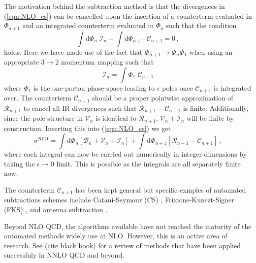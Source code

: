 \documentclass[main.tex]{subfiles}
\begin{document}
    The motivation behind the subtraction method is that the
    divergences in (\ref{eqn:NLO_cs}) can be cancelled upon the insertion
    of a counterterm evaluated in $\Phi_{n+1}$ and an integrated counterterm
    evaluated in $\Phi_{n}$ such that the condition
    \begin{equation}\label{eqn:subtraction_term_condition}
        \int \mathrm{d}\Phi_{n} \; \mathcal{I}_{n} - \int \mathrm{d}\Phi_{n+1} \; \mathcal{C}_{n+1} = 0 \, ,
    \end{equation}
    holds. Here we have made use of the fact that
    $\Phi_{n+1} \rightarrow \Phi_{n}\Phi_{1}$ when using
    an appropriate $3 \rightarrow 2$ momentum mapping such that
    \begin{equation}\label{eqn:integrated_counterterm}
        \mathcal{I}_{n} = \int \Phi_{1} \; \mathcal{C}_{n+1}
    \end{equation}
    where $\Phi_{1}$ is the one-parton phase-space leading
    to $\epsilon$ poles once $\mathcal{C}_{n+1}$ is integrated over.
    The counterterm $\mathcal{C}_{n+1}$ should be a proper
    pointwise approximation of $\mathcal{R}_{n+1}$ to cancel all IR
    divergences such that $\mathcal{R}_{n+1} - \mathcal{C}_{n+1}$ is finite.
    Additionally, since the pole structure in $\mathcal{V}_{n}$ is identical
    to $\mathcal{R}_{n+1}$, $\mathcal{V}_{n} + \mathcal{I}_{n}$ will be finite
    by construction.
    Inserting this into (\ref{eqn:NLO_cs}) we get
    \begin{equation}\label{eqn:NLO_subtraction}
        \sigma^{\mathrm{NLO}} = \int \mathrm{d}\Phi_{n} \left[\mathcal{B}_{n} + \mathcal{V}_{n} + \mathcal{I}_{n}\right] + \int \mathrm{d}\Phi_{n+1} \left[\mathcal{R}_{n+1} - \mathcal{C}_{n+1}\right] \, ,
    \end{equation}
    where each integral can now be carried out numerically
    in integer dimensions by taking the $\epsilon \rightarrow 0$
    limit. This is possible as the integrals are all separately
    finite now.

    The counterterm $\mathcal{C}_{n+1}$ has been kept general
    but specific exmples of automated subtractions schemes include
    Catani-Seymour (CS) \cite{Catani:1996vz,Catani:2002hc},
    Frixione-Kunszt-Signer (FKS) \cite{Frixione:1995ms,Frixione:1997np},
    and antenna subtraction \cite{Campbell:1998nn,Kosower:1997zr,Kosower:2003bh}.

    Beyond NLO QCD, the algorithms available have
    not reached the maturity of the automated methods widely use
    at NLO. However, this is an active area of
    research. See (cite black book) for a review of methods
    that have been applied successfuly in NNLO QCD and beyond.
\end{document}
